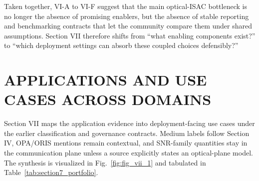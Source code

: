\documentclass[letterpaper,journal]{IEEEtran}
\begin{document}
Taken together, VI-A to VI-F suggest that the main optical-ISAC bottleneck is no longer the absence of promising enablers, but the absence of stable reporting and benchmarking contracts that let the community compare them under shared assumptions. Section VII therefore shifts from ``what enabling components exist?'' to ``which deployment settings can absorb these coupled choices defensibly?''


\section{APPLICATIONS AND USE CASES ACROSS DOMAINS}

Section VII maps the application evidence into deployment-facing use cases under the earlier classification and governance contracts. Medium labels follow Section IV, OPA/ORIS mentions remain contextual, and SNR-family quantities stay in the communication plane unless a source explicitly states an optical-plane model. The synthesis is visualized in Fig.~\ref{fig:fig_vii_1} and tabulated in Table~\ref{tab:section7_portfolio}.
\end{document}
